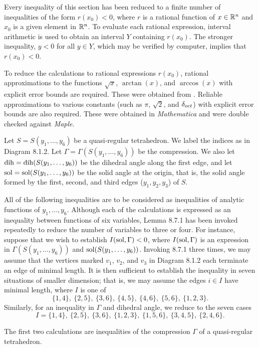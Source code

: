 Every inequality of this section has been reduced to a finite
number of inequalities of the form $r(x_0)<0$, where $r$ is
a rational function of $x\in {\Bbb R}^n$ and $x_0$ is a given
element in ${\Bbb R}^n$.  To evaluate each rational expression,
interval arithmetic is used to obtain an interval $Y$ containing
$r(x_0)$.  The stronger inequality,
$y<0$ for all $y\in Y$, which may be verified by computer,
implies that $r(x_0)<0$.

To reduce the calculations to rational expressions $r(x_0)$,
rational approximations to the functions $\sqrt{x}$, $\arctan(x)$,
and $\arccos(x)$ with explicit error bounds are required.
These were obtained from \cite{CA}.  Reliable approximations to
various constants (such as $\pi$, $\sqrt{2}$, and $\delta_{oct}$) with
explicit error bounds are also required.  These were obtained
in {\it Mathematica\/} and were double checked against {\it Maple}.



\bigskip
Let $S=S(y_1,\ldots,y_6)$ be a quasi-regular 
tetrahedron.
We label the indices as in
Diagram 8.1.2.  Let $\Gamma=\Gamma(S(y_1,\ldots,y_6))$ be the compression.
We also
let $\operatorname{dih}=\operatorname{dih}(S(y_1,\ldots,y_6))$ be the dihedral angle along the
first edge,
and let $\operatorname{sol}=\operatorname{sol}(S(y_1,\ldots,y_6))$ be the solid angle at the
origin, that is, the solid angle formed by the first, second, and third
edges ($y_1,y_2,y_3$) of $S$.

All of the following inequalities are to be considered as inequalities
of analytic functions of $y_1,\ldots,y_6$.  Although each of the
calculations is expressed as an inequality between functions of
six variables, Lemma 8.7.1 has been invoked repeatedly to reduce
the number of variables to three or four.
For instance, suppose that we wish to establish $I(\operatorname{sol},\Gamma)<0$,
where $I(\operatorname{sol},\Gamma)$ is an expression in $\Gamma(S(y_1,\ldots,y_6))$
and $\operatorname{sol}(S(y_1,\ldots,y_6))$.  Invoking 8.7.1 three times, we may
assume that the vertices marked $v_1$, $v_2$, and $v_3$ 
in Diagram 8.1.2
each terminate an edge of minimal length.  It is then sufficient
to establish the inequality in seven situations of
smaller dimension; that is, we may assume the  edges
$i\in I$ have minimal length, where $I$
is one of
$$\{1,4\},\ \{2,5\},\ \{3,6\},\ \{4,5\},\ \{4,6\},\ \{5,6\},\ \{1,2,3\}.$$
Similarly, for an inequality in $\Gamma$ and dihedral angle, we reduce to
the seven cases
$$I=\{1,4\},\ \{2,5\},\ \{3,6\},\ \{1,2,3\},\ \{1,5,6\},\
        \{3,4,5\},\ \{2,4,6\}.$$

The first two calculations
are inequalities of the compression $\Gamma$ of a quasi-regular tetrahedron.

